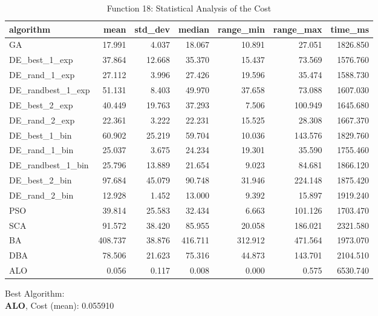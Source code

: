\documentclass[12pt]{article}
\begin{document}
\begin{table}[H]
    \centering
    \footnotesize
    \begin{adjustbox}{width=1\textwidth}
        \begin{tabular}{lrrrrrr}
            \toprule
            algorithm &    mean &  std\_dev &  median &  range\_min &  range\_max &  time\_ms \\
            \midrule
            GA & 17.991 & 4.037 & 18.067 & 10.891 & 27.051 & 1826.850 \\
            DE\_best\_1\_exp & 37.864 & 12.668 & 35.370 & 15.437 & 73.569 & 1576.760 \\
            DE\_rand\_1\_exp & 27.112 & 3.996 & 27.426 & 19.596 & 35.474 & 1588.730 \\
            DE\_randbest\_1\_exp & 51.131 & 8.403 & 49.970 & 37.658 & 73.088 & 1607.030 \\
            DE\_best\_2\_exp & 40.449 & 19.763 & 37.293 & 7.506 & 100.949 & 1645.680 \\
            DE\_rand\_2\_exp & 22.361 & 3.222 & 22.231 & 15.525 & 28.308 & 1667.370 \\
            DE\_best\_1\_bin & 60.902 & 25.219 & 59.704 & 10.036 & 143.576 & 1829.760 \\
            DE\_rand\_1\_bin & 25.037 & 3.675 & 24.234 & 19.301 & 35.590 & 1755.460 \\
            DE\_randbest\_1\_bin & 25.796 & 13.889 & 21.654 & 9.023 & 84.681 & 1866.120 \\
            DE\_best\_2\_bin & 97.684 & 45.079 & 90.748 & 31.946 & 224.148 & 1875.420 \\
            DE\_rand\_2\_bin & 12.928 & 1.452 & 13.000 & 9.392 & 15.897 & 1919.240 \\
            PSO & 39.814 & 25.583 & 32.434 & 6.663 & 101.126 & 1703.470 \\
            SCA & 91.572 & 38.420 & 85.955 & 20.058 & 186.021 & 2321.580 \\
            BA & 408.737 & 38.876 & 416.711 & 312.912 & 471.564 & 1973.070 \\
            DBA & 78.506 & 21.623 & 75.316 & 44.873 & 143.701 & 2104.510 \\
            ALO & 0.056 & 0.117 & 0.008 & 0.000 & 0.575 & 6530.740 \\
            \bottomrule
        \end{tabular}
        
        
    \end{adjustbox}
    \caption{Function 18: Statistical Analysis of the Cost} 
\end{table}
Best Algorithm: \\
\textbf{ALO}, Cost (mean): 0.055910\\
\end{document}
